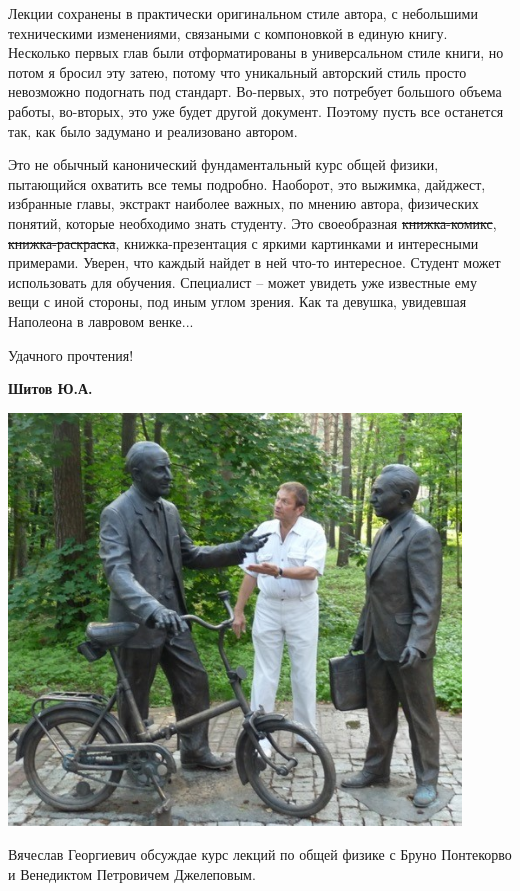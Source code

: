 Лекции сохранены в практически оригинальном стиле автора, с небольшими техническими изменениями,  связаными с компоновкой в единую книгу. Несколько первых глав были отформатированы в универсальном стиле книги, но потом я бросил эту затею, потому что уникальный авторский стиль просто невозможно подогнать под стандарт. Во-первых, это потребует большого объема работы, во-вторых, это уже будет другой документ. Поэтому пусть все останется так, как было задумано и реализовано автором.

Это не обычный канонический фундаментальный курс общей физики, пытающийся охватить все темы подробно. Наоборот, это выжимка, дайджест, избранные главы, экстракт наиболее важных, по мнению автора, физических понятий, которые необходимо знать студенту. Это своеобразная \sout{книжка-комикс}, \sout{книжка-раскраска}, книжка-презентация с яркими картинками и интересными примерами. Уверен, что каждый найдет в ней что-то интересное. Студент может использовать для обучения. Специалист – может увидеть уже известные ему вещи с иной стороны, под иным углом зрения. Как та девушка, увидевшая Наполеона в лавровом венке...

Удачного прочтения!

{\bf Шитов Ю.А.}

\centering
\includegraphics[width=0.9\textwidth]{photos/egorov_pontecorvo_djelepov.jpg}

Вячеслав Георгиевич обсуждае курс лекций по общей физике с Бруно Понтекорво и Венедиктом Петровичем Джелеповым.
